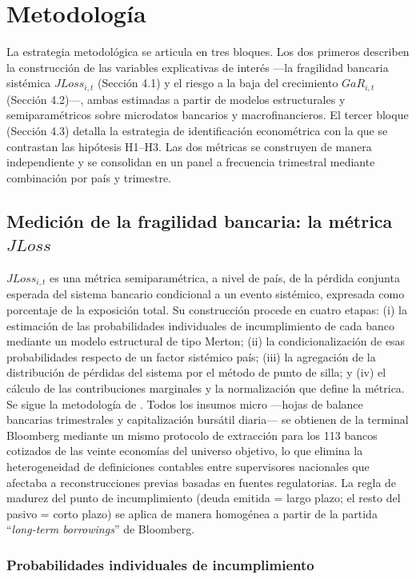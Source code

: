 \section{Metodología}

La estrategia metodológica se articula en tres bloques. Los dos primeros describen la construcción de las variables explicativas de interés —la fragilidad bancaria sistémica $JLoss_{i,t}$ (Sección 4.1) y el riesgo a la baja del crecimiento $GaR_{i,t}$ (Sección 4.2)—, ambas estimadas a partir de modelos estructurales y semiparamétricos sobre microdatos bancarios y macrofinancieros. El tercer bloque (Sección 4.3) detalla la estrategia de identificación econométrica con la que se contrastan las hipótesis H1–H3. Las dos métricas se construyen de manera independiente y se consolidan en un panel a frecuencia trimestral mediante combinación por país y trimestre.

\subsection{Medición de la fragilidad bancaria: la métrica \texorpdfstring{$JLoss$}{JLoss}}

$JLoss_{i,t}$ es una métrica semiparamétrica, a nivel de país, de la pérdida conjunta esperada del sistema bancario condicional a un evento sistémico, expresada como porcentaje de la exposición total. Su construcción procede en cuatro etapas: (i) la estimación de las probabilidades individuales de incumplimiento de cada banco mediante un modelo estructural de tipo Merton; (ii) la condicionalización de esas probabilidades respecto de un factor sistémico país; (iii) la agregación de la distribución de pérdidas del sistema por el método de punto de silla; y (iv) el cálculo de las contribuciones marginales y la normalización que define la métrica. Se sigue la metodología de \citet{Chari2024b}. Todos los insumos micro —hojas de balance bancarias trimestrales y capitalización bursátil diaria— se obtienen de la terminal Bloomberg mediante un mismo protocolo de extracción para los 113 bancos cotizados de las veinte economías del universo objetivo, lo que elimina la heterogeneidad de definiciones contables entre supervisores nacionales que afectaba a reconstrucciones previas basadas en fuentes regulatorias. La regla de madurez del punto de incumplimiento (deuda emitida = largo plazo; el resto del pasivo = corto plazo) se aplica de manera homogénea a partir de la partida ``\textit{long-term borrowings}'' de Bloomberg.

\subsubsection{Probabilidades individuales de incumplimiento}

